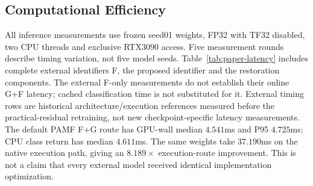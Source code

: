 \subsection{Computational Efficiency}

All inference measurements use frozen seed01 weights, FP32 with TF32 disabled, two CPU threads and exclusive RTX3090 access. Five measurement rounds describe timing variation, not five model seeds. Table~\ref{tab:paper-latency} includes complete external identifiers F, the proposed identifier and the restoration components. The external F-only measurements do not establish their online G+F latency; cached classification time is not substituted for it. External timing rows are historical architecture/execution references measured before the practical-residual retraining, not new checkpoint-specific latency measurements. The default PAMF F+G route has GPU-wall median $4.541$ms and P95 $4.725$ms; CPU class return has median $4.611$ms. The same weights take $37.190$ms on the native execution path, giving an $8.189\times$ execution-route improvement. This is not a claim that every external model received identical implementation optimization.


